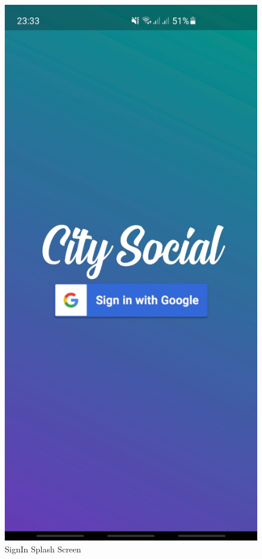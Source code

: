 \begin{figure}[!htb]
    \centering
    \includegraphics[scale=0.20]{AppScreenShots/SignIn Splashscreen.jpeg}
    \caption{SignIn Splash Screen}
    \label{fig:SignIn Splash Screen}
\end{figure}

